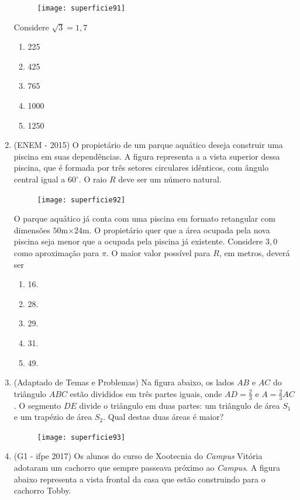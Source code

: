 \begin{enumerate}
\begin{figure}[H]
  \texttt{[image: superficie91]}
  \end{figure}

  Considere $\sqrt{3}=1{,}7$

  \begin{enumerate}
    \item 225
    \item 425
    \item 765
    \item 1000
    \item 1250
  \end{enumerate}

  \item (ENEM - 2015) O propietário de um parque aquático deseja construir uma piscina em suas dependências. A figura representa a a vista superior dessa piscina, que é formada por três setores circulares idênticos, com ângulo central igual a $60^{\circ}$. O raio $R$ deve ser um número natural.

  \begin{figure}[H]
  \centering

  \texttt{[image: superficie92]}
  \end{figure}

  O parque aquático já conta com uma piscina em formato retangular com dimensões $50$m$\times24$m. O propietário quer que a área ocupada pela nova piscina seja menor que a ocupada pela piscina já existente. Considere $3{,}0$ como aproximação para $\pi$. O maior valor possível para $R$, em metros, deverá ser

  \begin{enumerate}
    \item 16.
    \item 28.
    \item 29.
    \item 31.
    \item 49.
  \end{enumerate}

  \item (Adaptado de Temas e Problemas) Na figura abaixo, os lados $AB$ e $AC$ do triângulo $ABC$ estão divididos em três partes iguais, onde $\displaystyle AD=\frac{2}{3}\text{ e }A=\frac{2}{3}AC$. O segmento $DE$ divide o triângulo em duas partes: um triângulo de área $S_1$ e um trapézio de área $S_2$. Qual destas duas áreas é maior?

  \begin{figure}[H]
  \centering

  \texttt{[image: superficie93]}
  \end{figure}
\clearpage
  \item (G1 - ifpe 2017) Os alunos do curso de Xootecnia do \textit{Campus} Vitória adotaram um cachorro que sempre passeava próximo ao \textit{Campus}. A figura abaixo representa a vista frontal da casa que estão construindo para o cachorro Tobby.


\end{enumerate}
